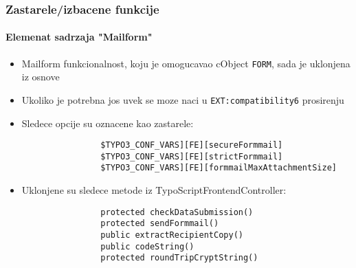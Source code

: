 
\begin{frame}[fragile]
	\frametitle{Zastarele/izbacene funkcije}
	\framesubtitle{Elemenat sadrzaja "Mailform"}

	\begin{itemize}

		\item Mailform funkcionalnost, koju je omogucavao cObject \texttt{FORM}, sada je uklonjena iz osnove
		
		\item Ukoliko je potrebna jos uvek se moze naci u \texttt{EXT:compatibility6} prosirenju

		\item Sledece opcije su oznacene kao zastarele:

			\begin{lstlisting}
				$TYPO3_CONF_VARS][FE][secureFormmail]
				$TYPO3_CONF_VARS][FE][strictFormmail]
				$TYPO3_CONF_VARS][FE][formmailMaxAttachmentSize]
			\end{lstlisting}

		\item Uklonjene su sledece metode iz TypoScriptFrontendController:

			\begin{lstlisting}
				protected checkDataSubmission()
				protected sendFormmail()
				public extractRecipientCopy()
				public codeString()
				protected roundTripCryptString()
			\end{lstlisting}

	\end{itemize}

\end{frame}


